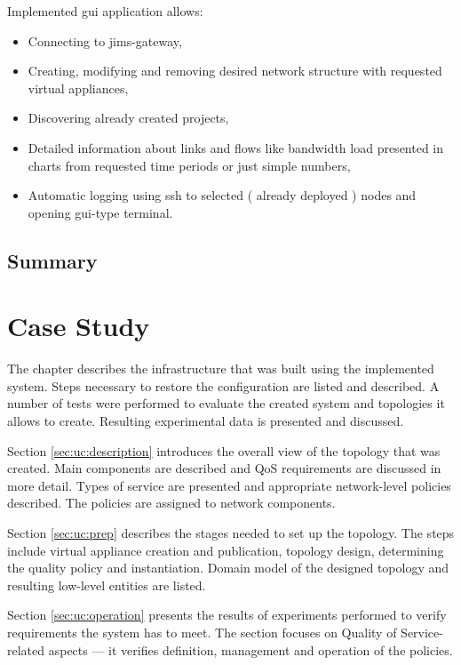 \documentclass[11pt]{book}
\begin{document}
		Implemented gui application allows:
		\begin{itemize}
			\item{Connecting to jims-gateway,}
			\item{Creating, modifying and removing desired network structure with requested virtual appliances,}
			\item{Discovering already created projects,}
			\item{Detailed information about links and flows like bandwidth load presented in charts from requested time periods or just simple numbers,}
			\item{Automatic logging using ssh to selected ( already deployed ) nodes and opening gui-type terminal.}
		\end{itemize}


    \section*{Summary}


  \chapter{Case Study}

    The chapter describes the infrastructure that was built using the implemented system. Steps necessary to restore the
    configuration are listed and described. A number of tests were performed to evaluate the created system and
    topologies it allows to create. Resulting experimental data is presented and discussed.

    Section \ref{sec:uc:description} introduces the overall view of the topology that was created. Main components are
    described and QoS requirements are discussed in more detail. Types of service are presented and appropriate
    network-level policies described. The policies are assigned to network components.

    Section \ref{sec:uc:prep} describes the stages needed to set up the topology. The steps include virtual appliance
    creation and publication, topology design, determining the quality policy and instantiation. Domain model of the
    designed topology and resulting low-level entities are listed.

    Section \ref{sec:uc:operation} presents the results of experiments performed to verify requirements the system has
    to meet. The section focuses on Quality of Service-related aspects --- it verifies definition, management and
    operation of the policies.
\end{document}
